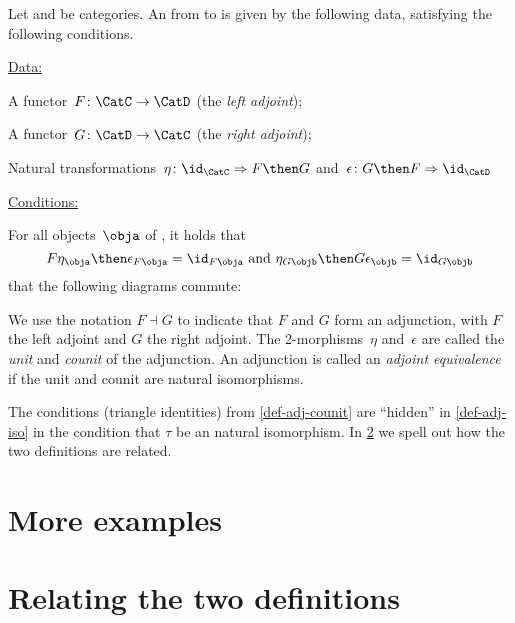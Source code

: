\begin{ctdefinition}\label{def-adj-counit}
  \label{def:cat-adjunction}
 Let \CatC and \CatD be categories. An \emph{} from \CatC to \CatD is given by the following data, satisfying the following conditions.

  \underline{Data:}
  \begin{compactenum}
    \item A functor~$F\colon \CatC \to \CatD$ (the \emph{left adjoint});
    \item A functor~$G\colon \CatD \to \CatC$ (the \emph{right adjoint});
    \item Natural transformations~$\eta \colon \id_\CatC \Rightarrow F \then G$ and~$\epsilon \colon G \then F \Rightarrow \id_\CatD$
  \end{compactenum}

  \underline{Conditions:}
  \begin{compactenum}
    \item For all objects~$\obja$ of \CatC, it holds that
    \begin{equation*}
      F\eta_\obja \then \epsilon_{F\obja} = \id_{F\obja} \text{ and }  \eta_{G\objb} \then G\epsilon_\objb = \id_{G\objb}
    \end{equation*}
     that the following diagrams commute:

\begin{center}
\end{center}
  \end{compactenum}
  We use the notation $F \dashv G$ to indicate that $F$ and $G$ form an adjunction, with $F$ the left adjoint and $G$ the right adjoint. 
  The 2-morphisms~$\eta$ and~$\epsilon$ are called the \emph{unit} and \emph{counit} of the adjunction.
  An adjunction is called an \emph{adjoint equivalence} if the unit and counit are natural isomorphisms.
\end{ctdefinition}

\begin{remark}
The conditions (triangle identities) from \cref{def-adj-counit} are ``hidden'' in \cref{def-adj-iso} in the condition that $\tau$ be an natural isomorphism. In \cref{relate-adj-defs} we spell out how the two definitions are related. 
\end{remark}

\section{More examples}



\section{Relating the two definitions}\label{relate-adj-defs}



